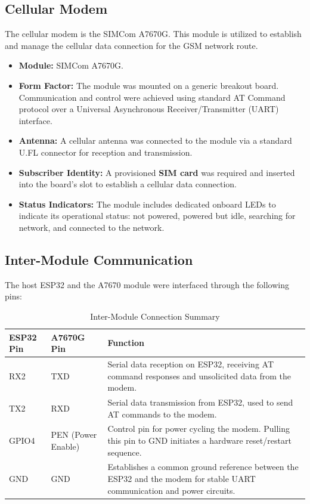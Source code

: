 \subsection{Cellular Modem}
\label{ssec:modem}
The cellular modem is the SIMCom A7670G. This module is utilized to establish and manage the cellular data connection for the GSM network route.

\begin{itemize}
    \item \textbf{Module:} SIMCom A7670G.
    \item \textbf{Form Factor:} The module was mounted on a generic breakout board. Communication and control were achieved using standard AT Command protocol over a Universal Asynchronous Receiver/Transmitter (UART) interface.
    \item \textbf{Antenna:} A cellular antenna was connected to the module via a standard U.FL connector for reception and transmission.
    \item \textbf{Subscriber Identity:} A provisioned \textbf{SIM card} was required and inserted into the board's slot to establish a cellular data connection.
    \item \textbf{Status Indicators:} The module includes dedicated onboard LEDs to indicate its operational status: not powered, powered but idle, searching for network, and connected to the network.
\end{itemize}

\subsection{Inter-Module Communication}
The host ESP32 and the A7670 module were interfaced through the following pins:

\begin{table}[H]
    \centering
    \caption{Inter-Module Connection Summary}
    \label{tab:connections}
    \renewcommand{\arraystretch}{1.5}
    \begin{tabular}{>{\raggedright\arraybackslash}p{3cm} 
                    >{\raggedright\arraybackslash}p{3cm} 
                    >{\raggedright\arraybackslash}p{8cm}}
        \hline
        \textbf{ESP32 Pin} & \textbf{A7670G Pin} & \textbf{Function} \\
        \hline
        RX2 & TXD & Serial data reception on ESP32, receiving AT command responses and unsolicited data from the modem. \\
        TX2 & RXD & Serial data transmission from ESP32, used to send AT commands to the modem. \\
        GPIO4 & PEN (Power Enable) & Control pin for power cycling the modem. Pulling this pin to GND initiates a hardware reset/restart sequence. \\
        GND & GND & Establishes a common ground reference between the ESP32 and the modem for stable UART communication and power circuits. \\
        \hline
    \end{tabular}
\end{table}


